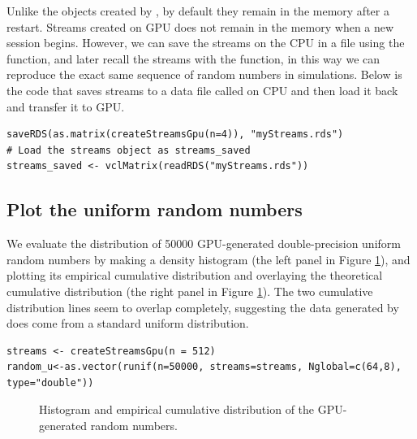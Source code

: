 \documentclass[article,nojss]{jss}\usepackage[]{graphicx}\usepackage[]{color}
\makeatletter
\newenvironment{kframe}{%
 \def\at@end@of@kframe{}%
 \ifinner\ifhmode%
  \def\at@end@of@kframe{\end{minipage}}%
  \begin{minipage}{\columnwidth}%
 \fi\fi%
 \def\FrameCommand##1{\hskip\@totalleftmargin \hskip-\fboxsep
 \colorbox{shadecolor}{##1}\hskip-\fboxsep
     \hskip-\linewidth \hskip-\@totalleftmargin \hskip\columnwidth}%
 \MakeFramed {\advance\hsize-\width
   \@totalleftmargin\z@ \linewidth\hsize
   \@setminipage}}%
 {\par\unskip\endMakeFramed%
 \at@end@of@kframe}
\newenvironment{knitrout}{}{} %
\newcommand{\fct}[1]{\code{#1()}}
\makeatother
\begin{document}
Unlike the objects created by , by default they remain in the memory after a restart. Streams created on GPU does not remain in the memory when a new  session begins. However, we can save the streams on the CPU in a file using the \fct{saveRDS} function, and later recall the streams with the \fct{readRDS} function, in this way we can reproduce the exact same sequence of random numbers in simulations. Below is the code that saves streams to a data file called  on CPU and then load it back and transfer it to GPU.
\begin{knitrout}
\color{fgcolor}\begin{kframe}
\begin{verbatim}
saveRDS(as.matrix(createStreamsGpu(n=4)), "myStreams.rds")
# Load the streams object as streams_saved
streams_saved <- vclMatrix(readRDS("myStreams.rds"))
\end{verbatim}
\end{kframe}
\end{knitrout}

\subsection{Plot the uniform random numbers}
We evaluate the distribution of 50000 GPU-generated double-precision uniform random numbers by making a density histogram  (the left panel in Figure \ref{fig0}), and plotting its empirical cumulative distribution and overlaying the theoretical cumulative distribution (the right panel in Figure \ref{fig0}). The two cumulative distribution lines seem to overlap completely, suggesting the data generated by \fct{runif} does come from a standard uniform distribution.
\begin{knitrout}
\color{fgcolor}\begin{kframe}
\begin{verbatim}
streams <- createStreamsGpu(n = 512)
random_u<-as.vector(runif(n=50000, streams=streams, Nglobal=c(64,8), type="double"))
\end{verbatim}
\end{kframe}
\end{knitrout}
\begin{figure}[H]
\centering

\caption{Histogram and empirical cumulative distribution of the GPU-generated random numbers.\label{fig0}}
\end{figure}
\end{document}
